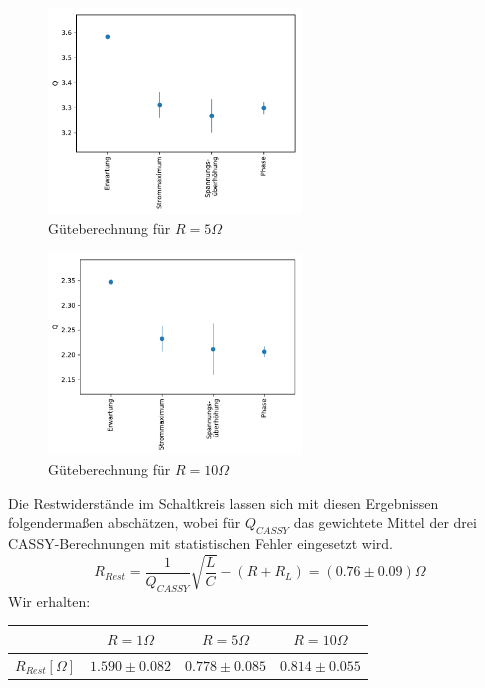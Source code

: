 \documentclass[12pt,a4paper]{article}
\begin{document}
\begin{figure}[H]
	\centering
	\includegraphics[width=0.6\textwidth]{Python/S5_Fazit.pdf}
	\caption{Güteberechnung für $R=5\Omega$}
	\label{S5_Fazit}
\end{figure}
\begin{figure}[H]
	\centering
	\includegraphics[width=0.6\textwidth]{Python/S10_Fazit.pdf}
	\caption{Güteberechnung für $R=10\Omega$}
	\label{S10_Fazit}
\end{figure}
Die Restwiderstände im Schaltkreis lassen sich mit diesen Ergebnissen folgendermaßen abschätzen, wobei für $Q_{CASSY}$ das gewichtete Mittel der drei CASSY-Berechnungen mit statistischen Fehler eingesetzt wird.
\begin{equation}
R_{Rest}=\frac{1}{Q_{CASSY}}\sqrt{\frac{L}{C}}-(R+R_L)=(0.76\pm0.09)\Omega
\end{equation}
Wir erhalten:
\begin{table}[H]
	\centering
	\begin{tabular}{|l|c|c|c|}
		\hline
		&$R=1\Omega$&$R=5\Omega$&$R=10\Omega$\\
		\hline
		$R_{Rest}[\Omega]$&$1.590\pm 0.082$&$0.778\pm 0.085$&$0.814\pm 0.055$\\
		\hline
	\end{tabular}
\end{table}
\end{document}
